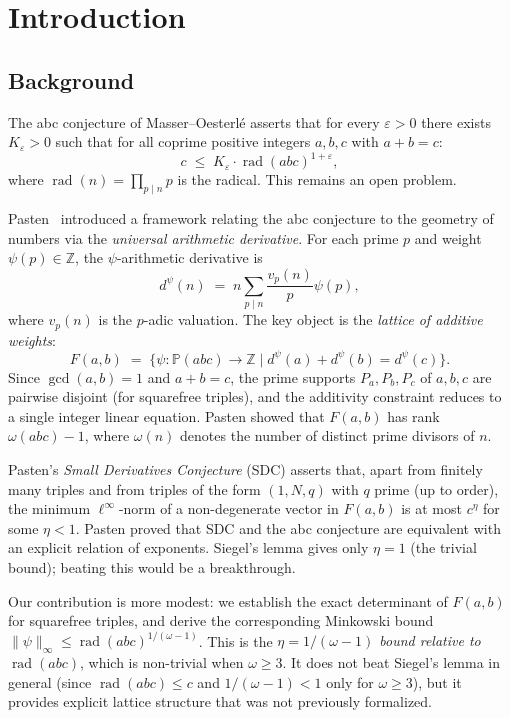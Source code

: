 \documentclass[12pt]{article}
\theoremstyle{definition}
\DeclareMathOperator{\rad}{rad}
\begin{document}
\section{Introduction}

\subsection{Background}

The abc conjecture of Masser--Oesterl\'e asserts that for every $\varepsilon>0$
there exists $K_\varepsilon > 0$ such that for all coprime positive integers $a,b,c$
with $a+b=c$:
\[
  c \;\le\; K_\varepsilon \cdot \rad(abc)^{1+\varepsilon},
\]
where $\rad(n) = \prod_{p \mid n} p$ is the radical.  This remains an open problem.

Pasten~\cite{Pasten2021} introduced a framework relating the abc conjecture to
the geometry of numbers via the \emph{universal arithmetic derivative}.
For each prime $p$ and weight $\psi(p) \in \mathbb{Z}$, the
$\psi$-arithmetic derivative is
\[
  d^\psi(n) \;=\; n \sum_{p \mid n} \frac{v_p(n)}{p} \psi(p),
\]
where $v_p(n)$ is the $p$-adic valuation.  The key object is the
\emph{lattice of additive weights}:
\[
  F(a,b) \;=\; \bigl\{ \psi \colon \mathbb{P}(abc) \to \mathbb{Z}
    \;\big|\; d^\psi(a) + d^\psi(b) = d^\psi(c) \bigr\}.
\]
Since $\gcd(a,b)=1$ and $a+b=c$, the prime supports $P_a, P_b, P_c$ of $a,b,c$
are pairwise disjoint (for squarefree triples), and the additivity constraint
reduces to a single integer linear equation.  Pasten showed that $F(a,b)$ has
rank $\omega(abc)-1$, where $\omega(n)$ denotes the number of distinct prime
divisors of $n$.

Pasten's \emph{Small Derivatives Conjecture} (SDC) asserts that, apart from
finitely many triples and from triples of the form $(1,N,q)$ with $q$ prime
(up to order), the minimum $\ell^\infty$-norm of a non-degenerate vector in
$F(a,b)$ is at most $c^\eta$ for some $\eta < 1$.  Pasten proved that SDC and
the abc conjecture are equivalent with an explicit relation of exponents.
Siegel's lemma gives only $\eta = 1$ (the trivial bound); beating this would
be a breakthrough.

Our contribution is more modest: we establish the exact determinant of $F(a,b)$
for squarefree triples, and derive the corresponding Minkowski bound
$\|\psi\|_\infty \le \rad(abc)^{1/(\omega-1)}$.  This is the
\emph{$\eta = 1/(\omega-1)$ bound relative to $\rad(abc)$}, which is
non-trivial when $\omega \ge 3$.  It does not beat Siegel's lemma in general
(since $\rad(abc) \le c$ and $1/(\omega-1) < 1$ only for $\omega \ge 3$),
but it provides explicit lattice structure that was not previously formalized.
\end{document}
